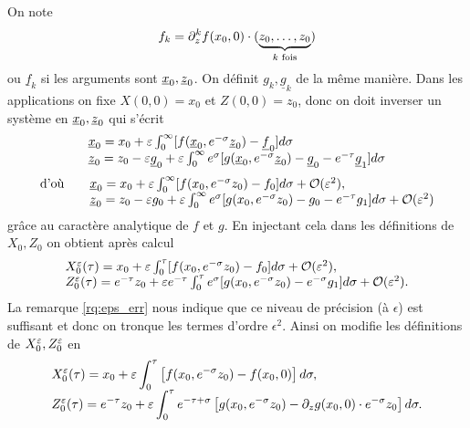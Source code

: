 On note 
\begin{equation} \label{def:f_k}
f_k = \partial_{z}^k f(x_0,0)\cdot(\underbrace{z_0,\ldots,z_0}_{k \text{ fois}})
\end{equation}
ou $\underline{f}_k$ si les arguments sont $\underline{x}_0,\underline{z}_0$. 
On définit $g_k,\underline{g}_k$ de la même manière. 
Dans les applications on fixe $X(0,0) = x_0$ et $Z(0,0) = z_0$, donc on doit inverser un système en $\underline{x}_0,\underline{z}_0$ qui s'écrit 
$$ \begin{array}{l}
\underline{x}_0 = x_0 + \varepsilon\int_0^{\infty} [f(\underline{x}_0,e^{-\sigma}\underline{z}_0) - \underline{f}_0]d\sigma \\
\underline{z}_0 = z_0 - \varepsilon \underline{g}_0 + \varepsilon\int_0^{\infty} e^{\sigma}[g(\underline{x}_0,e^{-\sigma}\underline{z}_0) - \underline{g}_0 - e^{-\tau}\underline{g}_1] d\sigma 
\end{array} $$
$$ \begin{array}{rl}
\text{d'où} \quad &\underline{x}_0 = x_0 + \varepsilon\int_0^{\infty} [f(x_0,e^{-\sigma}z_0) - f_0]d\sigma + \mathcal{O}(\varepsilon^2), \\
&\underline{z}_0 = z_0 - \varepsilon g_0 + \varepsilon\int_0^{\infty} e^{\sigma}[g(x_0,e^{-\sigma}z_0) - g_0 - e^{-\tau}g_1] d\sigma + \mathcal{O}(\varepsilon^2) 
\end{array} $$
grâce au caractère analytique de $f$ et $g$. En injectant cela dans les définitions de $X_0,Z_0$ on obtient après calcul
$$ \begin{array}{l}
X_0\eeps(\tau) = 
x_0 + \epsilon\int_0^{\tau} [f(x_0,e^{-\sigma}z_0) - f_0] d\sigma + \O(\epsilon^2) , \\
%
Z_0\eeps(\tau) = 
e^{-\tau}z_0 + \epsilon e^{-\tau}\int_0^{\tau} e^{\sigma} [g(x_0,e^{-\sigma}z_0) - e^{-\sigma}g_1] d\sigma + \O(\epsilon^2) .
\end{array} $$
La remarque \ref{rq:eps_err} nous indique que ce niveau de précision (à $\epsilon$) est suffisant et donc on tronque les termes d'ordre $\epsilon^2$. Ainsi on modifie les définitions de $X_0^{\varepsilon},Z_0^{\varepsilon}$ en 
\begin{equation} \label{eq:CI_tronquees}
\begin{array}{l}
\displaystyle
X_0^{\varepsilon}(\tau) = x_0 + \varepsilon\int_0^{\tau} \left[ f(x_0,e^{-\sigma}z_0) - f(x_0,0) \right] d\sigma , \\
\displaystyle
Z_0^{\varepsilon}(\tau) = e^{-\tau}z_0 + \varepsilon\int_0^{\tau} e^{-\tau+\sigma}\left[ g(x_0,e^{-\sigma}z_0) - \partial_{z} g(x_0,0)\cdot e^{-\sigma} z_0 \right] d\sigma .
\end{array}
\end{equation}

